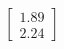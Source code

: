\documentclass[preview]{standalone}
\begin{document}
\begin{align*}
\begin{bmatrix} 1.89 \\ 2.24 \end{bmatrix}
\end{align*}
\end{document}
